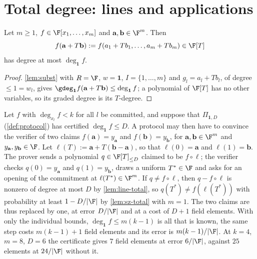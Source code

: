 {{\section{Total degree: lines and applications}

\begin{lemma}\label{lem:line-total}
Let $m\ge1$, $f\in\F[x_1,\dots,x_m]$ and $\mathbf a,\mathbf b\in\F^m$. Then
\[
f(\mathbf a+T\mathbf b):=f(a_1+Tb_1,\dots,a_m+Tb_m)\in\F[T]
\]
has degree at most $\deg_{\mathbf 1}f$.
\end{lemma}

\begin{proof}
\ref{lem:subst} with $R=\F$, $w=\mathbf 1$, $I=\{1,\dots,m\}$ and $g_l=a_l+Tb_l$, of degree
$\le1=w_l$, gives $\gdeg_{\mathbf 1}f(\mathbf a+T\mathbf b)\le\deg_{\mathbf 1}f$; a polynomial of
$\F[T]$ has no other variables, so its graded degree is its $T$-degree.
\end{proof}

\begin{remark}\label{rem:total-app}
Let $f$ with $\deg_{x_l}f<k$ for all $l$ be committed, and suppose that $\Pi_{\mathbf 1,D}$
(\ref{def:protocol}) has certified $\deg_{\mathbf 1}f\le D$. A protocol may then have to convince
the verifier of two claims $f(\mathbf a)=y_{\mathbf a}$ and $f(\mathbf b)=y_{\mathbf b}$, for
$\mathbf a,\mathbf b\in\F^m$ and $y_{\mathbf a},y_{\mathbf b}\in\F$. Let
$\ell(T):=\mathbf a+T(\mathbf b-\mathbf a)$, so that $\ell(0)=\mathbf a$ and $\ell(1)=\mathbf b$. The
prover sends a polynomial $q\in\F[T]_{\le D}$ claimed to be $f\circ\ell$; the verifier checks
$q(0)=y_{\mathbf a}$ and $q(1)=y_{\mathbf b}$, draws a uniform $T^*\in\F$ and asks for an opening of
the commitment at $\ell(T^*)\in\F^m$. If $q\ne f\circ\ell$, then $q-f\circ\ell$ is nonzero of degree
at most $D$ by \ref{lem:line-total}, so $q(T^*)\ne f(\ell(T^*))$ with probability at least
$1-D/|\F|$ by \ref{lem:sz-total} with $m=1$. The two claims are thus replaced by one, at error
$D/|\F|$ and at a cost of $D+1$ field elements. With only the individual bounds,
$\deg_{\mathbf 1}f\le m(k-1)$ is all that is known, the same step costs $m(k-1)+1$ field elements and
its error is $m(k-1)/|\F|$. At
$k=4$, $m=8$, $D=6$ the certificate gives $7$ field elements at error $6/|\F|$, against $25$
elements at $24/|\F|$ without it.
\end{remark}

}}
